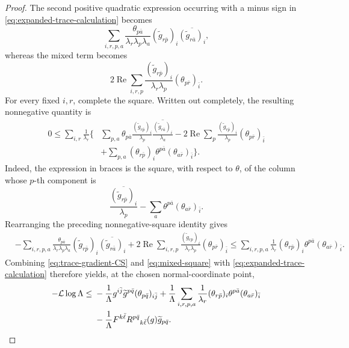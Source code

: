 \documentclass[reqno]{amsart}
\theoremstyle{plain}
\theoremstyle{remark}
\begin{document}
\begin{proof}
The second positive quadratic expression occurring with a minus sign
in \eqref{eq:expanded-trace-calculation} becomes
\[
 \sum_{i,r,p,a}\frac{\theta_{p\bar a}}
 {\lambda_r\lambda_p\lambda_a}
 (\widetilde g_{r\bar p})_i
 \overline{(\widetilde g_{r\bar a})_i},
\]
whereas the mixed term becomes
\[
 2\operatorname{Re}\sum_{i,r,p}
 \frac{(\widetilde g_{r\bar p})_i}{\lambda_r\lambda_p}
 (\theta_{p\bar r})_{\bar i}.
\]
For every fixed $i,r$, complete the square.  Written out completely,
the resulting nonnegative quantity is
\begin{align*}
0\leq\sum_{i,r}\frac1{\lambda_r}\Biggl\{&
 \sum_{p,a}\theta_{p\bar a}
 \frac{(\widetilde g_{r\bar p})_i}{\lambda_p}
 \overline{\frac{(\widetilde g_{r\bar a})_i}{\lambda_a}}
 -2\operatorname{Re}\sum_p
 \frac{(\widetilde g_{r\bar p})_i}{\lambda_p}
 (\theta_{p\bar r})_{\bar i}\\
&+\sum_{p,a}(\theta_{r\bar p})_i\theta^{p\bar a}
 (\theta_{a\bar r})_{\bar i}\Biggr\}.
\end{align*}
Indeed, the expression in braces is the square, with respect to
$\theta$, of the column whose $p$-th component is
\[
 \frac{\overline{(\widetilde g_{r\bar p})_i}}{\lambda_p}
 -\sum_a\theta^{p\bar a}(\theta_{a\bar r})_{\bar i}.
\]
Rearranging the preceding nonnegative-square identity gives
\begin{align}
&-\sum_{i,r,p,a}\frac{\theta_{p\bar a}}
 {\lambda_r\lambda_p\lambda_a}
 (\widetilde g_{r\bar p})_i
 \overline{(\widetilde g_{r\bar a})_i}
 +2\operatorname{Re}\sum_{i,r,p}
 \frac{(\widetilde g_{r\bar p})_i}{\lambda_r\lambda_p}
 (\theta_{p\bar r})_{\bar i}
 \leq
 \sum_{i,r,p,a}\frac1{\lambda_r}
 (\theta_{r\bar p})_i\theta^{p\bar a}
 (\theta_{a\bar r})_{\bar i}.
\label{eq:mixed-square}
\end{align}
  Combining \eqref{eq:trace-gradient-CS} and
\eqref{eq:mixed-square} with
\eqref{eq:expanded-trace-calculation} therefore yields, at the chosen
normal-coordinate point,
\begin{align}
-\mathcal L\log\Lambda\leq{}&
-\frac1\Lambda g^{i\bar j}\widetilde g^{p\bar q}
 (\theta_{p\bar q})_{i\bar j}
 +\frac1\Lambda\sum_{i,r,p,a}\frac1{\lambda_r}
 (\theta_{r\bar p})_i\theta^{p\bar a}
 (\theta_{a\bar r})_{\bar i}\notag\\
&-\frac1\Lambda F^{k\bar\ell}
 R^{p\bar q}{}_{k\bar\ell}(g)\widetilde g_{p\bar q}.
\label{eq:surviving-coefficients}
\end{align}


\end{proof}
\end{document}
